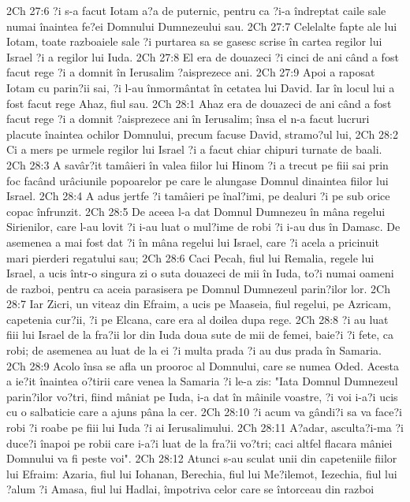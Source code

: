 2Ch 27:6  ?i s-a facut Iotam a?a de puternic, pentru ca ?i-a îndreptat caile sale numai înaintea fe?ei Domnului Dumnezeului sau.
2Ch 27:7  Celelalte fapte ale lui Iotam, toate razboaiele sale ?i purtarea sa se gasesc scrise în cartea regilor lui Israel ?i a regilor lui Iuda.
2Ch 27:8  El era de douazeci ?i cinci de ani când a fost facut rege ?i a domnit în Ierusalim ?aisprezece ani.
2Ch 27:9  Apoi a raposat Iotam cu parin?ii sai, ?i l-au înmormântat în cetatea lui David. Iar în locul lui a fost facut rege Ahaz, fiul sau.
2Ch 28:1  Ahaz era de douazeci de ani când a fost facut rege ?i a domnit ?aisprezece ani în Ierusalim; însa el n-a facut lucruri placute înaintea ochilor Domnului, precum facuse David, stramo?ul lui,
2Ch 28:2  Ci a mers pe urmele regilor lui Israel ?i a facut chiar chipuri turnate de baali.
2Ch 28:3  A savâr?it tamâieri în valea fiilor lui Hinom ?i a trecut pe fiii sai prin foc facând urâciunile popoarelor pe care le alungase Domnul dinaintea fiilor lui Israel.
2Ch 28:4  A adus jertfe ?i tamâieri pe înal?imi, pe dealuri ?i pe sub orice copac înfrunzit.
2Ch 28:5  De aceea l-a dat Domnul Dumnezeu în mâna regelui Sirienilor, care l-au lovit ?i i-au luat o mul?ime de robi ?i i-au dus în Damasc. De asemenea a mai fost dat ?i în mâna regelui lui Israel, care ?i acela a pricinuit mari pierderi regatului sau;
2Ch 28:6  Caci Pecah, fiul lui Remalia, regele lui Israel, a ucis într-o singura zi o suta douazeci de mii în Iuda, to?i numai oameni de razboi, pentru ca aceia parasisera pe Domnul Dumnezeul parin?ilor lor.
2Ch 28:7  Iar Zicri, un viteaz din Efraim, a ucis pe Maaseia, fiul regelui, pe Azricam, capetenia cur?ii, ?i pe Elcana, care era al doilea dupa rege.
2Ch 28:8  ?i au luat fiii lui Israel de la fra?ii lor din Iuda doua sute de mii de femei, baie?i ?i fete, ca robi; de asemenea au luat de la ei ?i multa prada ?i au dus prada în Samaria.
2Ch 28:9  Acolo însa se afla un prooroc al Domnului, care se numea Oded. Acesta a ie?it înaintea o?tirii care venea la Samaria ?i le-a zis: "Iata Domnul Dumnezeul parin?ilor vo?tri, fiind mâniat pe Iuda, i-a dat în mâinile voastre, ?i voi i-a?i ucis cu o salbaticie care a ajuns pâna la cer.
2Ch 28:10  ?i acum va gândi?i sa va face?i robi ?i roabe pe fiii lui Iuda ?i ai Ierusalimului.
2Ch 28:11  A?adar, asculta?i-ma ?i duce?i înapoi pe robii care i-a?i luat de la fra?ii vo?tri; caci altfel flacara mâniei Domnului va fi peste voi".
2Ch 28:12  Atunci s-au sculat unii din capeteniile fiilor lui Efraim: Azaria, fiul lui Iohanan, Berechia, fiul lui Me?ilemot, Iezechia, fiul lui ?alum ?i Amasa, fiul lui Hadlai, împotriva celor care se întorceau din razboi
